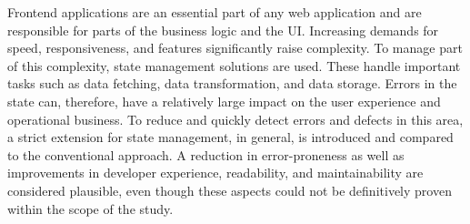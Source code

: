 Frontend applications are an essential part of any web application and are responsible for parts of the business logic and the UI. Increasing demands for speed, responsiveness, and features significantly raise complexity. To manage part of this complexity, state management solutions are used. These handle important tasks such as data fetching, data transformation, and data storage. Errors in the state can, therefore, have a relatively large impact on the user experience and operational business. To reduce and quickly detect errors and defects in this area, a strict extension for state management, in general, is introduced and compared to the conventional approach. A reduction in error-proneness as well as improvements in developer experience, readability, and maintainability are considered plausible, even though these aspects could not be definitively proven within the scope of the study.